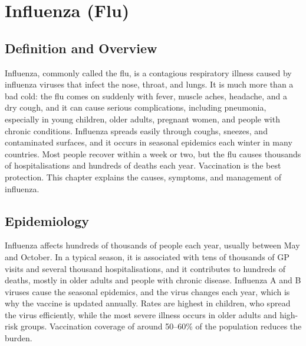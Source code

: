 \chapter{Influenza (Flu)}

\section*{Definition and Overview}
Influenza, commonly called the flu, is a contagious respiratory illness caused by influenza viruses that infect the nose, throat, and lungs. It is much more than a bad cold: the flu comes on suddenly with fever, muscle aches, headache, and a dry cough, and it can cause serious complications, including pneumonia, especially in young children, older adults, pregnant women, and people with chronic conditions. Influenza spreads easily through coughs, sneezes, and contaminated surfaces, and it occurs in seasonal epidemics each winter in many countries. Most people recover within a week or two, but the flu causes thousands of hospitalisations and hundreds of deaths each year. Vaccination is the best protection. This chapter explains the causes, symptoms, and management of influenza.

\section*{Epidemiology}
Influenza affects hundreds of thousands of people each year, usually between May and October. In a typical season, it is associated with tens of thousands of GP visits and several thousand hospitalisations, and it contributes to hundreds of deaths, mostly in older adults and people with chronic disease. Influenza A and B viruses cause the seasonal epidemics, and the virus changes each year, which is why the vaccine is updated annually. Rates are highest in children, who spread the virus efficiently, while the most severe illness occurs in older adults and high-risk groups. Vaccination coverage of around 50--60\% of the population reduces the burden.

